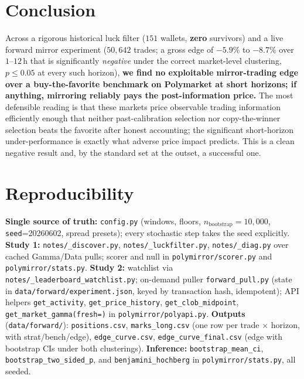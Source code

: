 \documentclass[11pt]{article}
\begin{document}
\section{Conclusion}
Across a rigorous historical luck filter ($151$ wallets, \textbf{zero} survivors) and a live
forward mirror experiment ($50{,}642$ trades; a gross edge of $-5.9\%$ to $-8.7\%$ over
$1$--$12$\,h that is significantly \emph{negative} under the correct market-level clustering,
$p\le0.05$ at every such horizon), \textbf{we find no exploitable mirror-trading edge over a
buy-the-favorite benchmark on Polymarket at short horizons; if anything, mirroring reliably
pays the post-information price.} The most defensible reading is that these markets price
observable trading information efficiently enough that neither past-calibration selection nor
copy-the-winner selection beats the favorite after honest accounting; the significant
short-horizon under-performance is exactly what adverse price impact predicts. This is a clean
negative result and, by the standard set at the outset, a successful one.

\appendix
\section{Reproducibility}
\textbf{Single source of truth:} \texttt{config.py} (windows, floors,
$n_{\text{bootstrap}}=10{,}000$, \texttt{seed}=20260602, spread presets); every stochastic step
takes the seed explicitly. \textbf{Study 1:} \texttt{notes/\_discover.py},
\texttt{notes/\_luckfilter.py}, \texttt{notes/\_diag.py} over cached Gamma/Data pulls; scorer and
null in \texttt{polymirror/scorer.py} and \texttt{polymirror/stats.py}. \textbf{Study 2:}
watchlist via \texttt{notes/\_leaderboard\_watchlist.py}; on-demand puller \texttt{forward\_pull.py}
(state in \texttt{data/forward/experiment.json}, keyed by transaction hash, idempotent); API
helpers \texttt{get\_activity}, \texttt{get\_price\_history}, \texttt{get\_clob\_midpoint},
\texttt{get\_market\_gamma(fresh=)} in \texttt{polymirror/polyapi.py}. \textbf{Outputs}
(\texttt{data/forward/}): \texttt{positions.csv}, \texttt{marks\_long.csv} (one row per trade
$\times$ horizon, with strat/bench/edge), \texttt{edge\_curve.csv}, \texttt{edge\_curve\_final.csv}
(edge with bootstrap CIs under both clusterings). \textbf{Inference:} \texttt{bootstrap\_mean\_ci},
\texttt{bootstrap\_two\_sided\_p}, and \texttt{benjamini\_hochberg} in \texttt{polymirror/stats.py},
all seeded.
\end{document}
